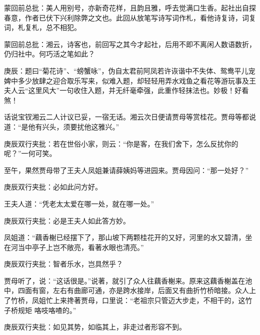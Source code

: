 \begin{parag}
    \begin{note}蒙回前总批：美人用别号，亦新奇花样，且韵且雅，呼去觉满口生香。起社出自探春意，作者已伏下兴利除弊之文也。此回从放笔写诗写词作札，看他诗复诗，词复词，札复札，总不相犯。\end{note}
\end{parag}


\begin{parag}
    \begin{note}蒙回前总批：湘云，诗客也，前回写之其今才起社，后用不即不离闲人数语数折，仍归社中。何巧活之笔如此？\end{note}
\end{parag}


\begin{parag}
    \begin{note}庚辰：题曰“菊花诗”、“螃蟹咏”，伪自太君前阿凤若许诙谐中不失体、鸳鸯平儿宠婢中多少放肆之迎合取乐写来，似难入题，却轻轻用弄水戏鱼之看花等游玩事及王夫人云“这里风大”一句收住入题，并无纤毫牵强，此重作轻抹法也。妙极！好看煞！\end{note}
\end{parag}


\begin{parag}
    话说宝钗湘云二人计议已妥，一宿无话。湘云次日便请贾母等赏桂花。贾母等都说道：“是他有兴头，须要扰他这雅兴。”\begin{note}庚辰双行夹批：若在世俗小家，则云：“你是客，在我们舍下，怎么反扰你的呢？”一何可笑。\end{note}至午，果然贾母带了王夫人凤姐兼请薛姨妈等进园来。贾母因问：“那一处好？”\begin{note}庚辰双行夹批：必如此问方好。\end{note}王夫人道：“凭老太太爱在哪一处，就在哪一处。”\begin{note}庚辰双行夹批：必是王夫人如此答方妙。\end{note}凤姐道：“藕香榭已经摆下了，那山坡下两颗桂花开的又好，河里的水又碧清，坐在河当中亭子上岂不敞亮，看著水眼也清亮。”\begin{note}庚辰双行夹批：智者乐水，岂具然乎？\end{note}贾母听了，说：“这话很是。”说著，就引了众人往藕香榭来。原来这藕香榭盖在池中，四面有窗，左右有曲廊可通，亦是跨水接岸，后面又有曲折竹桥暗接。众人上了竹桥，凤姐忙上来搀著贾母，口里说：“老祖宗只管迈大步走，不相干的，这竹子桥规矩 咯吱咯喳的。”\begin{note}庚辰双行夹批：如见其势，如临其上，非走过者形容不到。\end{note}
\end{parag}


